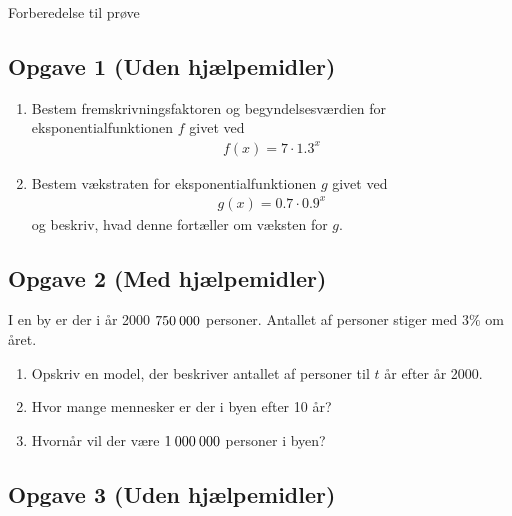 \documentclass[12pt]{article}
\begin{document}





\begin{center}
\Huge
Forberedelse til prøve	
\end{center}

\subsection*{Opgave 1 (Uden hjælpemidler)}

\begin{enumerate}[label=\roman*)]
	\item Bestem fremskrivningsfaktoren og begyndelsesværdien for eksponentialfunktionen $f$ givet ved
	\begin{align*}
		f(x) = 7\cdot 1.3^x
	\end{align*}
	\item Bestem vækstraten for eksponentialfunktionen $g$ givet ved
	\begin{align*}
		g(x) = 0.7\cdot 0.9^x
	\end{align*}
	og beskriv, hvad denne fortæller om væksten for $g$. 
\end{enumerate}


\subsection*{Opgave 2 (Med hjælpemidler)}

I en by er der i år 2000 $750\hspace{0.8mm} 000$ personer. Antallet af personer stiger med 3$\%$ om året.
\begin{enumerate}[label = \roman*)]
	\item Opskriv en model, der beskriver antallet af personer til $t$ år efter år 2000.
	\item Hvor mange mennesker er der i byen efter 10 år?
	\item Hvornår vil der være $1\hspace{0.8mm} 000\hspace{0.8mm} 000$ personer i byen?
\end{enumerate}

\subsection*{Opgave 3 (Uden hjælpemidler)}
\end{document}
